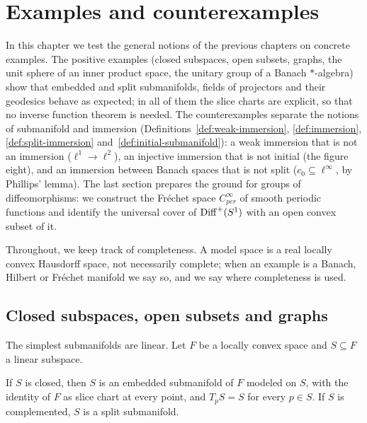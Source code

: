 \chapter{Examples and counterexamples}
\label{chap:examples}

In this chapter we test the general notions of the previous chapters on concrete examples. The
positive examples (closed subspaces, open subsets, graphs, the unit sphere of an inner product
space, the unitary group of a Banach $*$-algebra) show that embedded and split submanifolds,
fields of projectors and their geodesics behave as expected; in all of them the slice charts are
explicit, so that no inverse function theorem is needed. The counterexamples separate the
notions of submanifold and immersion (Definitions~\ref{def:weak-immersion},
\ref{def:immersion}, \ref{def:split-immersion} and~\ref{def:initial-submanifold}): a weak
immersion that is not an immersion ($\ell^1 \to \ell^2$), an injective immersion that is not
initial (the figure eight), and an immersion between Banach spaces that is not split
($c_0 \subseteq \ell^\infty$, by Phillips' lemma). The last section prepares the ground for
groups of diffeomorphisms: we construct the Fréchet space $C^\infty_{per}$ of smooth periodic
functions and identify the universal cover of $\operatorname{Diff}^+(S^1)$ with an open convex subset of it.

Throughout, we keep track of completeness. A model space is a real locally convex Hausdorff
space, not necessarily complete; when an example is a Banach, Hilbert or Fréchet manifold we say
so, and we say where completeness is used.

\section{Closed subspaces, open subsets and graphs}

The simplest submanifolds are linear. Let $F$ be a locally convex space and $S \subseteq F$ a
linear subspace.

\begin{proposition}
  \label{prop:ex-subspace}
  \leanok
  If $S$ is closed, then $S$ is an embedded submanifold of $F$ modeled on $S$, with the identity
  of $F$ as slice chart at every point, and $T_pS = S$ for every $p \in S$. If $S$ is
  complemented, $S$ is a split submanifold.
\end{proposition}

